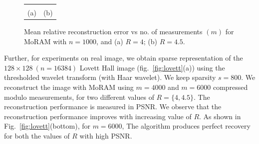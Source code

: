 \begin{figure}[!t]
	\begin{center}
		\setlength{\tabcolsep}{0pt}
		\renewcommand{\arraystretch}{0.5}
		\begin{tabular}{cc}
			\resizebox{0.5\linewidth}{!}{} &
			\resizebox{0.45\linewidth}{!}{} \\
			(a) & %
			(b) \\
		\end{tabular}
	\end{center}
	\caption{{Mean relative reconstruction error vs no. of measurements $(m)$ for MoRAM with $n=1000$, and (a) $R=4$; %
			(b) $R=4.5$.}}
	\label{fig:plot}
\end{figure}
Further, for experiments on real image, we obtain sparse representation of the $128 \times 128~(n=16384)$ Lovett Hall image (fig.~\ref{fig:lovett}(a)) using the thresholded wavelet transform (with Haar wavelet). We keep sparsity $s = 800$. We reconstruct the image with MoRAM using $m = 4000$ and $m=6000$ compressed modulo measurements, for two different values of $R =\{4,4.5\}$. The reconstruction performance is measured in PSNR. We observe that the reconstruction performance improves with increasing value of $R$. As shown in Fig.~\ref{fig:lovett}(bottom), for $m=6000$, The algorithm produces perfect recovery for both the values of $R$ with high PSNR.
%


